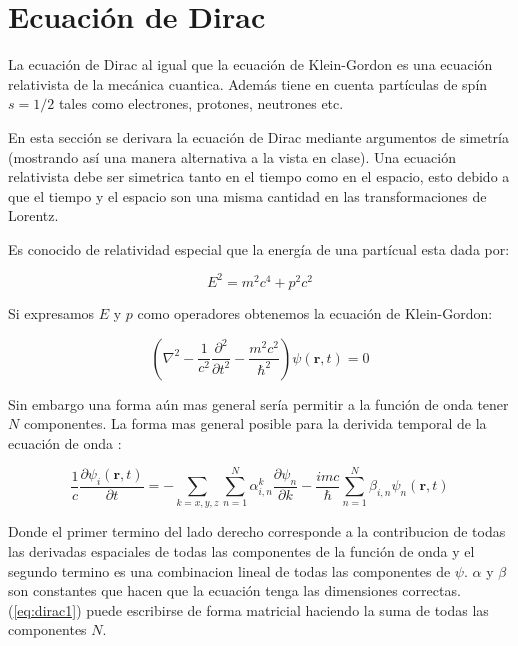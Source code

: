 \documentclass[a4paper, 12pt]{article} %
\begin{document}
\section{Ecuaci\'on de Dirac}
La ecuaci\'on de Dirac al igual que la ecuaci\'on de Klein-Gordon es una 
ecuaci\'on relativista de la mec\'anica cuantica. Adem\'as tiene en cuenta
part\'iculas de sp\'in $s=1/2$ tales como electrones, protones, neutrones etc. 

En esta secci\'on se derivara la ecuaci\'on de Dirac mediante argumentos
de simetr\'ia (mostrando as\'i una manera alternativa a la vista en clase). 
Una ecuaci\'on relativista debe ser simetrica tanto en el tiempo como en el 
espacio, esto debido a que el tiempo y el espacio son una misma cantidad 
en las transformaciones de Lorentz.

Es conocido de relatividad especial que la energ\'ia de una part\'icual esta dada
por:

\begin{equation}
E^2 = m^2c^4 + p^2c^2
\end{equation}

Si expresamos $E$ y $p$ como operadores obtenemos la ecuaci\'on de Klein-Gordon:

\begin{equation}
\left( \nabla^2 - \dfrac{1}{c^2}\dfrac{\partial^2}{\partial t^2} - \dfrac{m^2c^2}{\hbar^2}   \right)\psi(\mathbf{r}, t) = 0
\end{equation} 


Sin embargo una forma a\'un mas general ser\'ia permitir a la funci\'on de onda tener $N$ componentes. La forma mas 
general posible para la derivida temporal de la ecuaci\'on de onda \cite{dirac1,dirac2}:

\begin{equation}\label{eq:dirac1}
\dfrac{1}{c}\dfrac{\partial \psi_i(\mathbf{r},t)}{\partial t} =
- \sum \limits_{k=x,y,z} \sum \limits_{n=1}^{N}\alpha^k_{i,n} \dfrac{\partial \psi_n}{\partial k} -
\dfrac{imc}{\hbar}\sum \limits_{n=1}^{N}\beta_{i,n}\psi_n(\mathbf{r}, t)
\end{equation}

Donde el primer termino del lado derecho corresponde a la contribucion 
de todas las derivadas espaciales de todas las componentes de la funci\'on 
de onda y el segundo termino es una combinacion lineal de todas las 
componentes de $\psi$. $\alpha$ y $\beta$ son constantes que hacen que la 
ecuaci\'on tenga las dimensiones correctas. (\ref{eq:dirac1}) puede escribirse
de forma matricial haciendo la suma de todas las componentes $N$.   
\end{document}
